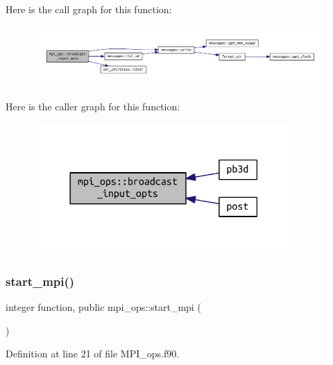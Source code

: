 Here is the call graph for this function\+:
\nopagebreak
\begin{figure}[H]
\begin{center}
\leavevmode
\includegraphics[width=350pt]{namespacempi__ops_a932eba1c998dd7a0f1191b55cd754be3_cgraph}
\end{center}
\end{figure}
Here is the caller graph for this function\+:
\nopagebreak
\begin{figure}[H]
\begin{center}
\leavevmode
\includegraphics[width=282pt]{namespacempi__ops_a932eba1c998dd7a0f1191b55cd754be3_icgraph}
\end{center}
\end{figure}
\mbox{\label{namespacempi__ops_a804ec65ff711509de1f8873f97bdf967}} 
\subsubsection{\texorpdfstring{start\+\_\+mpi()}{start\_mpi()}}
{\footnotesize\ttfamily integer function, public mpi\+\_\+ops\+::start\+\_\+mpi (\begin{DoxyParamCaption}{ }\end{DoxyParamCaption})}



Definition at line 21 of file M\+P\+I\+\_\+ops.\+f90.

